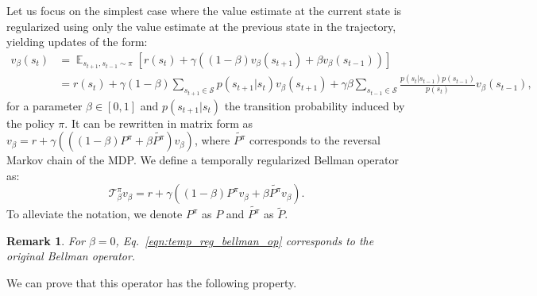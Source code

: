\documentclass{article}
\newtheorem*{remark}{Remark}
\newcommand{\param}{\beta}
\newcommand{\s}{\mathcal{S}}
\newcommand{\pol}{\pi}
\newcommand{\T}{\mathcal{T}}
\newcommand{\V}{v}
\newcommand{\Vr}{\V_{\param}}
\newcommand{\regT}{\T^{\pol}_{\param}}
\newcommand{\expect}{\mathop{\mathbb{E}}}
\begin{document}
Let us focus on the simplest case where the value estimate at the current state is regularized using only the value estimate at the previous state in the trajectory, yielding updates of the form: %
\begin{equation}
    \begin{split}
        \Vr(s_{t}) &= \expect_{s_{t+1},s_{t-1} \sim \pi} [r(s_t) + \gamma ((1-\param)\Vr(s_{t+1}) + \param \Vr(s_{t-1}))]\\
         &= r(s_t) + \gamma (1-\param)\sum_{s_{t+1}\in \s} p(s_{t+1}|s_t)\Vr(s_{t+1})
         + \gamma \param \sum_{s_{t-1} \in \s}\frac{p(s_t|s_{t-1}) p(s_{t-1})}{p(s_t)} \Vr(s_{t-1}),
    \end{split}
\end{equation}
for a parameter $\param \in [0,1]$ and $p(s_{t+1}|s_t)$ the transition probability induced by the policy $\pol$. It can be rewritten in matrix form as $\Vr = r + \gamma (((1-\param) P^{\pol} + \param \widetilde{P^{\pol}})\Vr) $, where $\widetilde{P^{\pol}}$ corresponds to the reversal Markov chain of the MDP.
We define a temporally regularized Bellman operator as:
\begin{equation}
\label{eqn:temp_reg_bellman_op}
    \regT v_{\param} = r + \gamma ((1-\param) P^{\pol}v_{\param} + \param \widetilde{P^{\pol}} v_{\param}).
\end{equation}
To alleviate the notation, we denote $P^{\pol}$ as $P$ and $\widetilde{P^{\pol}}$ as $\widetilde{P}$.
\begin{remark}
For $\param =0$, Eq.~\ref{eqn:temp_reg_bellman_op} corresponds to the original Bellman operator.
\end{remark}
We can prove that this operator has the following property.
\end{document}
